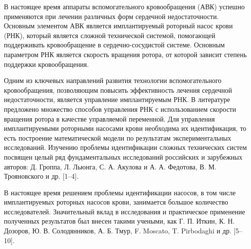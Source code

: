 {\actuality}


В настоящее время аппараты вспомогательного кровообращения (АВК) успешно применяются при лечении различных форм сердечной недостаточности. Основным элементом АВК является имплантируемый роторный насос крови (РНК), который является сложной технической системой, помогающей поддерживать кровообращение в сердечно-сосудистой системе. Основным параметром РНК является скорость вращения ротора, от которой зависит степень поддержки кровообращения.

% 

Одним из ключевых направлений развития технологии вспомогательного кровообращения, позволяющим повысить эффективность лечения сердечной недостаточности, является управление имплантируемым РНК. В литературе предложено множество способов управления РНК с использованием скорости вращения ротора в качестве управляемой переменной. Для управления имплантируемыми роторными насосами крови необходима их идентификация, то есть построение математической модели по результатам экспериментальных исследований. Изучению проблемы идентификации сложных технических систем посвящен целый ряд фундаментальных исследований российских и зарубежных авторов: Д. Гроппа, Л. Льюнга, С. А. Акулова и А. А. Федотова, В. М. Трояновского и др. [1--4]. %

В настоящее время решением проблемы идентификации насосов, в том числе имплантируемых роторных насосов крови, занимается большое количество исследователей. Значительный вклад в исследования и практическое применение полученных результатов был внесен такими учеными, как Г. П. Иткин, К. Н. Дозоров, Ю. В. Солодянников, А. Б. Тмур, F. Moscato, T. Pirbodaghi и др. [5--10].%


